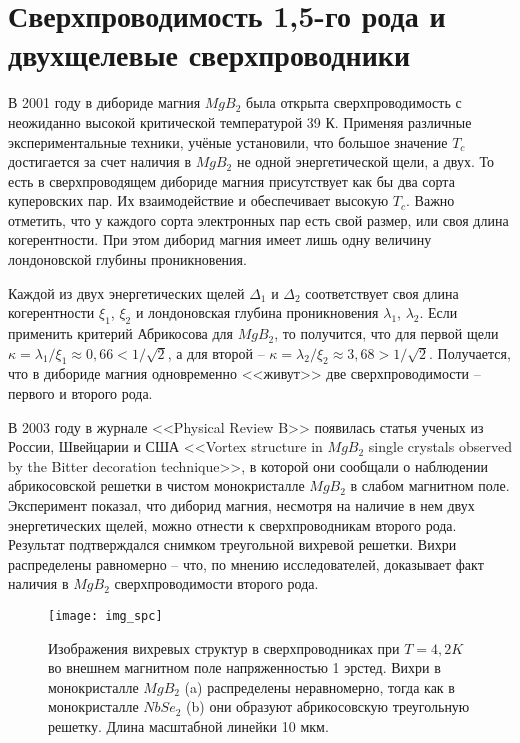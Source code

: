 \section{Сверхпроводимость 1,5-го рода и двухщелевые сверхпроводники}

В 2001 году в дибориде магния \( MgB_2 \) была открыта сверхпроводимость с 
неожиданно высокой критической температурой 39 К. Применяя различные 
экспериментальные техники, учёные установили, что большое значение \( T_c \) 
достигается за счет наличия в \( MgB_2 \) не одной энергетической щели, а 
двух. То есть в сверхпроводящем дибориде магния присутствует как бы два сорта 
куперовских пар. Их взаимодействие и обеспечивает высокую \( T_c \). Важно 
отметить, что у каждого сорта электронных пар есть свой размер, или своя длина 
когерентности. При этом диборид магния имеет лишь одну величину лондоновской 
глубины проникновения. \cite{bib:net}

Каждой из двух энергетических щелей \( \Delta_1 \) и \( \Delta_2 \) 
соответствует своя длина когерентности \( \xi_1 \), \( \xi_2 \) и лондоновская 
глубина проникновения \( \lambda_1 \), \( \lambda_2 \). Если применить 
критерий Абрикосова для \( MgB_2 \), то получится, что для первой щели 
\( \kappa = \lambda_1 / \xi_1 \approx 0,66 < 1/\sqrt{2} \), а для второй -- 
\( \kappa = \lambda_2 / \xi_2 \approx 3,68 > 1/\sqrt{2} \). Получается, что в 
дибориде магния одновременно <<живут>> две сверхпроводимости -- первого и 
второго рода.

В 2003 году в журнале <<Physical Review B>> появилась статья ученых из России, 
Швейцарии и США <<Vortex structure in \( MgB_2 \) single crystals observed by 
the Bitter decoration technique>>, в которой они сообщали о наблюдении 
абрикосовской решетки в чистом монокристалле \( MgB_2 \) в слабом магнитном 
поле. Эксперимент показал, что диборид магния, несмотря на наличие в нем двух 
энергетических щелей, можно отнести к сверхпроводникам второго рода. 
Результат подтверждался снимком треугольной вихревой решетки. Вихри 
распределены равномерно -- что, по мнению исследователей, доказывает факт 
наличия в \( MgB_2 \) сверхпроводимости второго рода.

\begin{figure}[h!]
    \center
    \texttt{[image: img\_spc]}
    \caption{Изображения вихревых структур в сверхпроводниках при 
        \( T = 4,2 K \) во внешнем магнитном поле напряженностью 1 эрстед.
        Вихри в монокристалле \( MgB_2 \) (a) распределены неравномерно, тогда 
        как в монокристалле \( NbSe_2 \) (b) они образуют абрикосовскую 
        треугольную решетку. Длина масштабной линейки 10 мкм.}
    \label{img:spc}
\end{figure}

